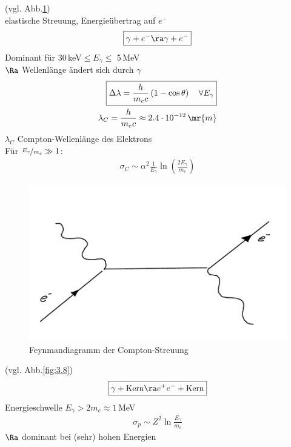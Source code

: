  (vgl. Abb.\ref{fig:3.7})\\
elastische Streuung, Energieübertrag auf $e^-$
\begin{align*}
\boxed{ \gamma + e^- \ra \gamma + e^- }
\end{align*}
Dominant für 30\,keV$\leq E_\gamma \leq$ 5\,MeV\\
$\Ra$ Wellenlänge ändert sich durch $\gamma$
\begin{align*}
\boxed{ \Delta \lambda = \frac{h}{m_e c} \left( 1 - \cos \theta \right) \ \ \ \forall E_\gamma }\\
\lambda_C= \frac{h}{m_e c} \approx 2.4\cdot 10^{-12}\,\mr{m}
\end{align*}
$\lambda_C$ Compton-Wellenlänge des Elektrons\\
Für $\nicefrac{E_\gamma}{m_e} \gg 1$:
\begin{align*}
\sigma_C \sim \alpha^2 \frac{1}{E_\gamma}\ln \left( \frac{2 E_\gamma}{m_e}\right)
\end{align*}

\begin{figure}[!ht]
\centering
\includegraphics[width=.5\textwidth]{imgs/ep5-fig-3-7.pdf}
\caption{Feynmandiagramm der Compton-Streuung\label{fig:3.7}}
\end{figure}

  (vgl. Abb.\ref{fig:3.8})
\begin{align*}
\boxed{ \gamma + \text{Kern} \ra e^+e^-+\text{Kern} }
\end{align*}
  Energieschwelle $E_\gamma > 2m_e \approx 1$\,MeV
\begin{align*}
\sigma_p \sim Z^2 \ln \frac{E_\gamma}{m_e}
\end{align*}
$\Ra$ dominant bei (sehr) hohen Energien


